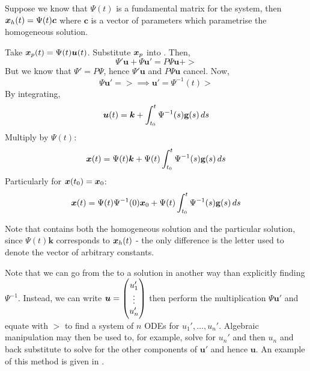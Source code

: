 Suppose we know that $\Psi(t)$ is a fundamental matrix for the system, then $\bm{x}_h(t) = \Psi(t)\bm{c}$ where $\bm{c}$ is a vector of parameters which parametrise the homogeneous solution.

Take $\bm{x}_p(t) = \Psi(t) \bm{u}(t)$. Substitute $\bm{x}_p$ into . Then,
\[
\Psi' \bm{u} + \Psi \bm{u}' = P\Psi \bm{u} + \gt
\]
But we know that $\Psi' = P\Psi$, hence $\Psi'\bm{u}$ and $P\Psi\bm{u}$ cancel. Now,
\begin{equation}\label{eq:varparamu}
	\Psi \bm{u}' = \gt \implies \bm{u}' = \Psi^{-1}(t) \gt
\end{equation}
By integrating, 
\[
\bm{u}(t) = \bm{k} + \int_{t_0}^t \Psi^{-1}(s) \textbf{g}(s)\,ds
\]
Multiply by $\Psi(t)$:
\begin{equation}\label{eq:varparam}
	\bm{x}(t) = \Psi(t)\bm{k} + \Psi(t) \int_{t_0}^t \Psi^{-1}(s) \textbf{g}(s)\,ds
\end{equation}
Particularly for $\bm{x}(t_0) = \bm{x}_0$:
\begin{equation}
	\bm{x}(t) = \Psi(t) \Psi^{-1}(0) \bm{x}_0 + \Psi(t) \int_{t_0}^t \Psi^{-1}(s) \textbf{g}(s)\,ds
\end{equation}

\begin{remark}
	Note that  contains both the homogeneous solution and the particular solution, since $\Psi(t) \bm{k}$ corresponds to $\bm{x}_h(t)$ - the only difference is the letter used to denote the vector of arbitrary constants.
\end{remark}

\begin{remark}
	Note that we can go from the  to a solution in another way than explicitly finding $\Psi^{-1}$. Instead, we can write $\bm{u} = \begin{pmatrix}u_1' \\ \vdots \\ u_n'\end{pmatrix}$ then perform the multiplication $\Psi \bm{u}'$ and equate with $\gt$ to find a system of $n$ ODEs for $u_1', \dots, u_n'$. Algebraic manipulation may then be used to, for example, solve for $u_n'$ and then $u_n$ and back substitute to solve for the other components of $\bm{u}'$ and hence $\bm{u}$. An example of this method is given in .
\end{remark}

